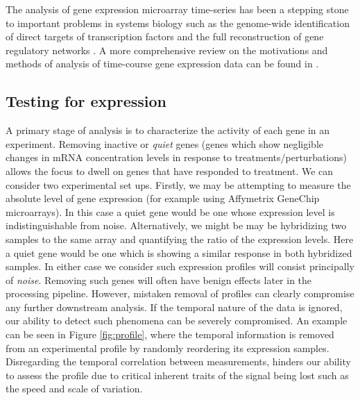     The analysis of gene expression microarray time-series has been a stepping
    stone to important problems in systems biology such as the genome-wide
    identification of direct targets of transcription factors \citep{della2008direct,
    honkela2010model} and the full reconstruction of gene regulatory networks
    \citep{bansal2006inference, finkenstadt2008reconstruction}. A more comprehensive
    review on the motivations and methods of analysis of time-course gene expression
    data can be found in \citep{bar2004analyzing}.


  \subsection{Testing for expression}
    A primary stage of analysis is to characterize the activity of each gene in an
    experiment. Removing inactive or \textit{quiet} genes (genes which show
    negligible changes in mRNA concentration levels in response to
    treatments/perturbations) allows the focus to dwell on genes that have responded
    to treatment. We can consider two experimental set ups. Firstly, we may be
    attempting to measure the absolute level of gene expression (for example using
    Affymetrix GeneChip microarrays). In this case a quiet gene would be one whose
    expression level is indistinguishable from noise. Alternatively, we might be may
    be hybridizing two samples to the same array and quantifying the ratio of the
    expression levels. Here a quiet gene would be one which is showing a similar
    response in both hybridized samples. In either case we consider such expression
    profiles will consist principally of \textit{noise}. Removing such genes will
    often have benign effects later in the processing pipeline. However, mistaken removal
    of profiles can clearly compromise any further downstream analysis. If the
    temporal nature of the data is ignored, our ability to detect such phenomena can
    be severely compromised. An example can be seen in Figure \ref{fig:profile},
    where the temporal information is removed from an experimental profile by
    randomly reordering its expression samples. Disregarding the temporal
    correlation between measurements, hinders our ability to assess the profile due
    to critical inherent traits of the signal being lost such as the speed and scale
    of variation.

